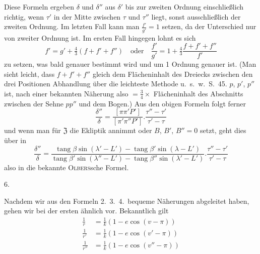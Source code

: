 Diese Formeln ergeben $\delta$ und $\delta''$ aus $\delta'$ bis zur zweiten Ordnung einschließlich richtig, wenn $\tau'$ in der Mitte zwischen $\tau$ und $\tau''$ liegt, sonst ausschließlich der zweiten Ordnung. Im letzten Fall kann man $\frac{f'}{g'}=1$ setzen, da der Unterschied nur von zweiter Ordnung ist. Im ersten Fall hingegen lohnt es sich
\[
f'=g'+\tfrac43(f+f'+f'')\quad\text{oder}\quad\frac{f'}{g'}=1+\tfrac43\frac{f+f'+f''}{f'}
\]
zu setzen, was bald genauer bestimmt wird und um 1 Ordnung genauer ist. (Man sieht leicht, dass $f+f'+f''$ gleich dem Flächeninhalt des Dreiecks zwischen den drei Positionen
%
\expandafter\def\csname HistoricalNoteText10\endcsname{Abhandlung über die leichteste Methode u.\ s.\ w.\ S.\ 45.}%
$p$, $p'$, $p''$ ist, nach einer bekannten Näherung also $=\frac34\times$ Flächeninhalt des Abschnitts zwischen der Sehne $pp''$ und dem Bogen.) Aus den obigen Formeln folgt ferner
\[
\frac{\delta''}{\delta}=\frac{[\pi\pi'P']}{[\pi'\pi''P']}.\frac{\tau''-\tau'}{\tau'-\tau}
\]
und wenn man für $\mathfrak{Z}$ die Ekliptik annimmt oder $B$, $B'$, $B''=0$ setzt, geht dies über in
\[
\frac{\delta''}{\delta}=\frac{\operatorname{tang}\beta\sin(\lambda'-L')-\operatorname{tang}\beta'\sin(\lambda-L')}{\operatorname{tang}\beta'\sin(\lambda''-L')-\operatorname{tang}\beta''\sin(\lambda'-L')}.\frac{\tau''-\tau'}{\tau'-\tau}
\]
also in die bekannte \textsc{Olbers}sche Formel.

\begin{center}6.\end{center}
Nachdem wir aus den Formeln 2.\ 3.\ 4.\ bequeme Näherungen abgeleitet haben, gehen wir bei der ersten ähnlich vor. Bekanntlich gilt
\[
\begin{aligned}
\frac1r&=\frac1k(1-e\cos(v-\pi))\\
\frac1{r'}&=\frac1k(1-e\cos(v'-\pi))\\
\frac1{r''}&=\frac1k(1-e\cos(v''-\pi))
\end{aligned}
\]


